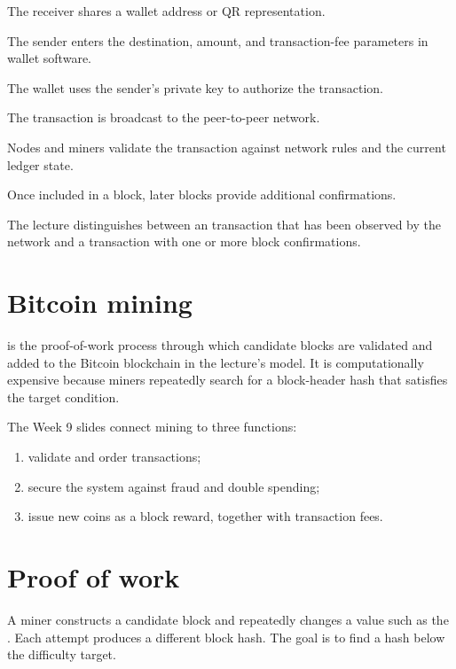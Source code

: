 \begin{mlsteps}
  \item The receiver shares a wallet address or QR representation.
  \item The sender enters the destination, amount, and transaction-fee parameters in wallet software.
  \item The wallet uses the sender's private key to authorize the transaction.
  \item The transaction is broadcast to the peer-to-peer network.
  \item Nodes and miners validate the transaction against network rules and the current ledger state.
  \item Once included in a block, later blocks provide additional confirmations.
\end{mlsteps}

The lecture distinguishes between an  transaction that has been observed by the network and a transaction with one or more block confirmations.

\section{Bitcoin mining}

 is the proof-of-work process through which candidate blocks are validated and added to the Bitcoin blockchain in the lecture's model. It is computationally expensive because miners repeatedly search for a block-header hash that satisfies the target condition.

The Week 9 slides connect mining to three functions:

\begin{enumerate}
  \item validate and order transactions;
  \item secure the system against fraud and double spending;
  \item issue new coins as a block reward, together with transaction fees.
\end{enumerate}

\section{Proof of work}

A miner constructs a candidate block and repeatedly changes a value such as the . Each attempt produces a different block hash. The goal is to find a hash below the difficulty target.

